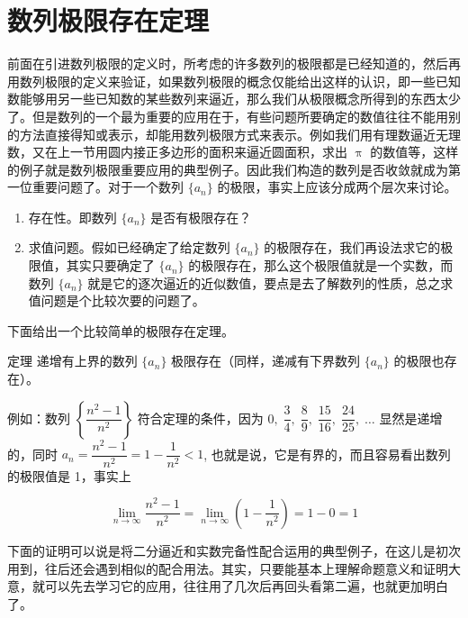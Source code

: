 \section{数列极限存在定理}
前面在引进数列极限的定义时，所考虑的许多数列的极限都是已经知道的，然后再用数列极限的定义来验证，如果数列极限的概念仅能给出这样的认识，即一些已知数能够用另一些已知数的某些数列来逼近，那么我们从极限概念所得到的东西太少了。但是数列的一个最为重要的应用在于，有些问题所要确定的数值往往不能用别的方法直接得知或表示，却能用数列极限方式来表示。例如我们用有理数逼近无理数，又在上一节用圆内接正多边形的面积来逼近圆面积，求出 $\uppi$ 的数值等，这样的例子就是数列极限重要应用的典型例子。因此我们构造的数列是否收敛就成为第一位重要问题了。对于一个数列 $\{a_n\}$ 的极限，事实上应该分成两个层次来讨论。

\begin{enumerate}
  \item 存在性。即数列 $\{a_n\}$ 是否有极限存在？
  \item 求值问题。假如已经确定了给定数列 $\{a_n\}$ 的极限存在，我们再设法求它的极限值，其实只要确定了 $\{a_n\}$ 的极限存在，那么这个极限值就是一个实数，而数列 $\{a_n\}$ 就是它的逐次逼近的近似数值，要点是去了解数列的性质，总之求值问题是个比较次要的问题了。 
\end{enumerate}

下面给出一个比较简单的极限存在定理。
\begin{Theorem}[极限存在定理]{定理}
  递增有上界的数列 $\{a_n\}$ 极限存在（同样，递减有下界数列 $\{a_n\}$ 的极限也存在）。
\end{Theorem}
 
{\linespread{1.65}\selectfont
例如：数列 $\left\{\dfrac{n^2-1}{n^2}\right\}$ 符合定理的条件，因为 
$0,\; \dfrac{3}{4},\; \dfrac{8}{9},\; \dfrac{15}{16},\; \dfrac{24}{25},\; \ldots$ 显然是递增的，同时 $a_n=\dfrac{n^2-1}{n^2}=1-\dfrac{1}{n^2}<1$, 也就是说，它是有界的，而且容易看出数列的极限值是 1，事实上\par}
\[\lim_{n\to\infty}\frac{n^2-1}{n^2}=\lim_{n\to\infty}\left(1-\frac{1}{n^2}\right)=1-0=1\]

下面的证明可以说是将二分逼近和实数完备性配合运用的典型例子，在这儿是初次用到，往后还会遇到相似的配合用法。其实，只要能基本上理解命题意义和证明大意，就可以先去学习它的应用，往往用了几次后再回头看第二遍，也就更加明白了。

